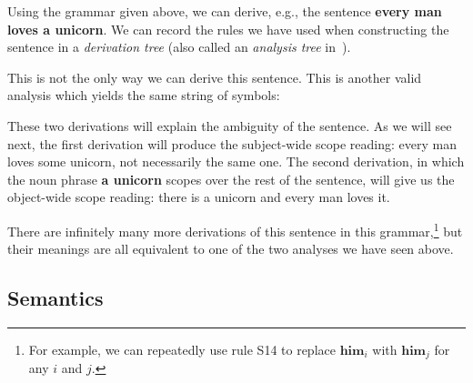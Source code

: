 Using the grammar given above, we can derive, e.g., the sentence
\textbf{every man loves a unicorn}. We can record the rules we have used
when constructing the sentence in a \emph{derivation tree} (also called an
\emph{analysis tree} in~\cite{montague1973proper}).

\begin{center}
\end{center}

This is not the only way we can derive this sentence. This is another valid
analysis which yields the same string of symbols:

\begin{center}
\end{center}

These two derivations will explain the ambiguity of the sentence. As we
will see next, the first derivation will produce the subject-wide scope
reading: every man loves some unicorn, not necessarily the same one. The
second derivation, in which the noun phrase \textbf{a unicorn} scopes over
the rest of the sentence, will give us the object-wide scope reading: there
is a unicorn and every man loves it.

There are infinitely many more derivations of this sentence in this
grammar,\footnote{For example, we can repeatedly use rule S14 to replace
  $\textbf{him}_i$ with $\textbf{him}_j$ for any $i$ and $j$.} but their
meanings are all equivalent to one of the two analyses we have seen above.


\subsection{Semantics}
\label{ssec:montague-semantics}

